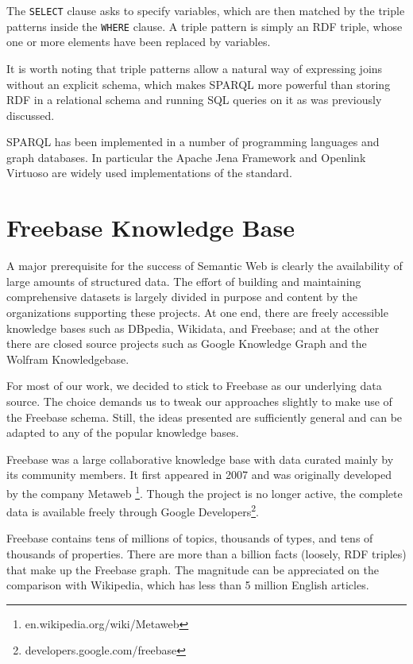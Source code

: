 \documentclass[a4paper, twoside, 12pt]{report}
\begin{document}
The \verb|SELECT| clause asks to specify variables, which are then matched by the triple patterns inside the \verb|WHERE| clause. A triple pattern is simply an RDF triple, whose one or more elements have been replaced by variables. 

It is worth noting that triple patterns allow a natural way of expressing joins without an explicit schema, which makes SPARQL more powerful than storing RDF in a relational schema and running SQL queries on it as was previously discussed.

SPARQL has been implemented in a number of programming languages and graph databases. In particular the Apache Jena Framework \cite{jena2013apache} and Openlink Virtuoso \cite{erling2009rdf} are widely used implementations of the standard.

\section{Freebase Knowledge Base}

A major prerequisite for the success of Semantic Web is clearly the availability of large amounts of structured data. The effort of building and maintaining comprehensive datasets is largely divided in purpose and content by the organizations supporting these projects. At one end, there are freely accessible knowledge bases such as DBpedia, Wikidata, and Freebase; and at the other there are closed source projects such as Google Knowledge Graph and the Wolfram Knowledgebase. 

For most of our work, we decided to stick to Freebase as our underlying data source. The choice demands us to tweak our approaches slightly to make use of the Freebase schema. Still, the ideas presented are sufficiently general and can be adapted to any of the popular knowledge bases.

Freebase was a large collaborative knowledge base with data curated mainly by its community members. It first appeared in 2007 and was originally developed by the company Metaweb \footnote{en.wikipedia.org/wiki/Metaweb}. Though the project is no longer active, the complete data is available freely through Google Developers\footnote{developers.google.com/freebase}.

Freebase contains tens of millions of topics, thousands of types, and tens of thousands of properties. There are more than a billion facts (loosely, RDF triples) that make up the Freebase graph. The magnitude can be appreciated on the comparison with Wikipedia, which has less than 5 million English articles. 
\end{document}
